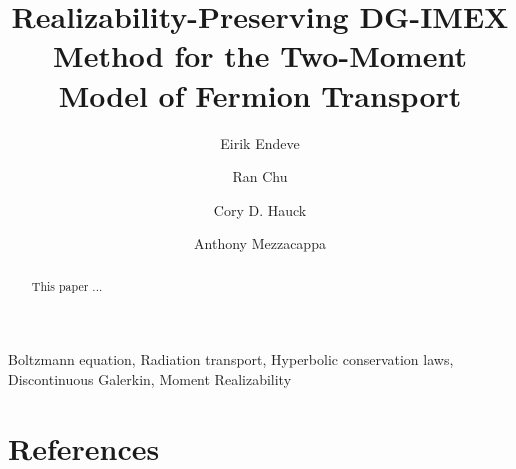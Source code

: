 \documentclass[review]{elsarticle}
\begin{document}
\begin{frontmatter}

\title{Realizability-Preserving DG-IMEX Method for the Two-Moment Model of Fermion Transport }

\author[ornl,utk-phys]{Eirik Endeve}

\author[utk-phys]{Ran Chu}

\author[ornl,utk-math]{Cory D. Hauck}

\author[utk-phys]{Anthony Mezzacappa}



\address[ornl]{Computational and Applied Mathematics Group, Oak Ridge National Laboratory, Oak Ridge, TN 37831 USA }

\address[utk-phys]{Department of Physics and Astronomy, University of Tennessee Knoxville, TN 37996-1200}

\address[utk-math]{Department of Mathematics, University of Tennessee Knoxville, TN 37996-1320}

\begin{abstract}
This paper ...
\end{abstract}

\begin{keyword}
Boltzmann equation, 
Radiation transport, 
Hyperbolic conservation laws, 
Discontinuous Galerkin, 
Moment Realizability
\end{keyword}

\end{frontmatter}

\tableofcontents

\linenumbers






\newpage

\newpage





\clearpage


\section*{References}


\end{document}
